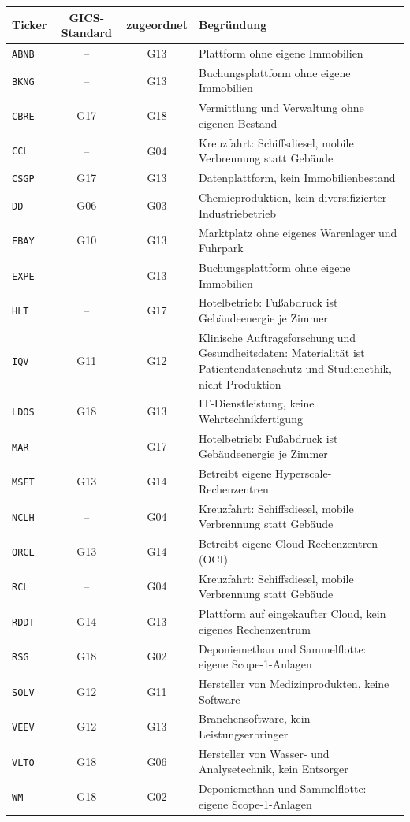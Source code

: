 \begin{tabularx}{\linewidth}{@{}l c c X@{}}
\toprule
Ticker & GICS-Standard & zugeordnet & Begründung \\
\midrule
\texttt{ABNB} & -- & G13 & Plattform ohne eigene Immobilien \\
\texttt{BKNG} & -- & G13 & Buchungsplattform ohne eigene Immobilien \\
\texttt{CBRE} & G17 & G18 & Vermittlung und Verwaltung ohne eigenen Bestand \\
\texttt{CCL} & -- & G04 & Kreuzfahrt: Schiffsdiesel, mobile Verbrennung statt Gebäude \\
\texttt{CSGP} & G17 & G13 & Datenplattform, kein Immobilienbestand \\
\texttt{DD} & G06 & G03 & Chemieproduktion, kein diversifizierter Industriebetrieb \\
\texttt{EBAY} & G10 & G13 & Marktplatz ohne eigenes Warenlager und Fuhrpark \\
\texttt{EXPE} & -- & G13 & Buchungsplattform ohne eigene Immobilien \\
\texttt{HLT} & -- & G17 & Hotelbetrieb: Fußabdruck ist Gebäudeenergie je Zimmer \\
\texttt{IQV} & G11 & G12 & Klinische Auftragsforschung und Gesundheitsdaten: Materialität ist Patientendatenschutz und Studienethik, nicht Produktion \\
\texttt{LDOS} & G18 & G13 & IT-Dienstleistung, keine Wehrtechnikfertigung \\
\texttt{MAR} & -- & G17 & Hotelbetrieb: Fußabdruck ist Gebäudeenergie je Zimmer \\
\texttt{MSFT} & G13 & G14 & Betreibt eigene Hyperscale-Rechenzentren \\
\texttt{NCLH} & -- & G04 & Kreuzfahrt: Schiffsdiesel, mobile Verbrennung statt Gebäude \\
\texttt{ORCL} & G13 & G14 & Betreibt eigene Cloud-Rechenzentren (OCI) \\
\texttt{RCL} & -- & G04 & Kreuzfahrt: Schiffsdiesel, mobile Verbrennung statt Gebäude \\
\texttt{RDDT} & G14 & G13 & Plattform auf eingekaufter Cloud, kein eigenes Rechenzentrum \\
\texttt{RSG} & G18 & G02 & Deponiemethan und Sammelflotte: eigene Scope-1-Anlagen \\
\texttt{SOLV} & G12 & G11 & Hersteller von Medizinprodukten, keine Software \\
\texttt{VEEV} & G12 & G13 & Branchensoftware, kein Leistungserbringer \\
\texttt{VLTO} & G18 & G06 & Hersteller von Wasser- und Analysetechnik, kein Entsorger \\
\texttt{WM} & G18 & G02 & Deponiemethan und Sammelflotte: eigene Scope-1-Anlagen \\
\bottomrule
\end{tabularx}
